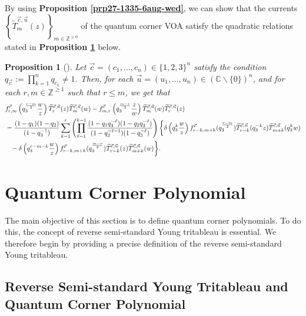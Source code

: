 \documentclass[12pt,reqno,a4paper]{amsart}
\newcommand{\bb}[1]{\mathbb{#1}}
\numberwithin{equation}{section}
\newtheorem{prop}[thm]{Proposition}
\theoremstyle{definition}
\begin{document}
By using \textbf{Proposition \ref{prp27-1335-6aug-wed}}, we can show that the currents $\left\{\widetilde{T}^{\vec{c},\vec{u}}_m(z)\right\}_{m \in  \bb{Z}^{\geq 0}}$ of the quantum corner VOA satisfy the quadratic relations stated in \textbf{Proposition \ref{prp29=1336-6aug}} below. 

\begin{prop}[\cite{CSw2024}]
\label{prp29=1336-6aug}
Let $\vec{c} = (c_1,\dots,c_n) \in \{1,2,3\}^n$ satisfy the condition $q_{\vec{c}} := \prod_{k = 1}^{n}q_{c_k} \neq 1$. Then, for each $\vec{u} = (u_1,\dots,u_n) \in (\bb{C} \backslash \{0\})^n$, 
and for each $r, m \in \bb{Z}^{\geq 1}$ such that $r \leq m$, we get that 
\begin{align}
	&f^{\vec{c}}_{r,m}\left(
	q^{\frac{r - m}{2}}_{3}\frac{w}{z} 
	\right)
	\widetilde{	T	}^{\vec{c},\vec{u}}_r(z )\widetilde{	T		}^{\vec{c},\vec{u}}_m(w ) 
	- f^{\vec{c}}_{m,r}\left(
	q^{\frac{m - r}{2}}_{3}\frac{z}{w} 
	\right)
	\widetilde{T}^{\vec{c},\vec{u}}_m(w )\widetilde{T}^{\vec{c},\vec{u}}_r(z )
	\notag \\
	&= 
	\frac{
		(1 - q_1)(1 - q_2)
	}{
		(1 - q_3^{-1})
	}
	\sum_{k = 1}^{r}
	\left(
	\prod_{\ell = 1}^{k-1}
	\frac{(1 -  q_1q_3^{-\ell})( 1 - q_2q_3^{-\ell})}{( 1 - q_3^{-\ell - 1})( 1 - q_3^{-\ell})}
	\right)
	\biggl\{
	\delta\left(q_3^k\frac{w}{z}\right)f^{\vec{c}}_{r-k,m+k}(q_3^{\frac{r-m}{2}} )\widetilde{T}^{\vec{c},\vec{u}}_{r-k}(q_3^{-k}z)\widetilde{T}^{\vec{c},\vec{u}}_{m+k}(q_3^kw)
	\notag \\ 
	&\hspace{0.3cm}- 
	\delta\left(q_3^{r-m-k}\frac{w}{z}\right)f^{\vec{c}}_{r-k,m+k}(q_3^{\frac{m-r}{2}})\widetilde{T}^{\vec{c},\vec{u}}_{r-k}(z )\widetilde{T}^{\vec{c},\vec{u}}_{m+k}(w)
	\biggr\}. 
\end{align}
\end{prop}

\section{Quantum Corner Polynomial}
\label{sec3-0010}

The main objective of this section is to define quantum corner polynomials. To do this, the concept of reverse semi-standard Young tritableau is essential. We therefore begin by providing a precise definition of the reverse semi-standard Young tritableau. 


\subsection{Reverse Semi-standard Young Tritableau and Quantum Corner Polynomial}
\end{document}
